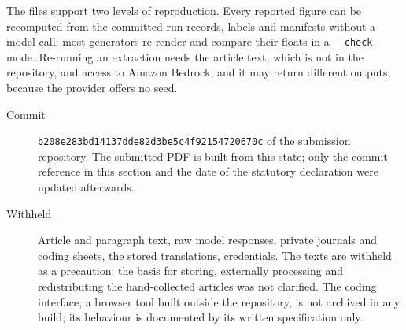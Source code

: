 \documentclass[12pt, a4paper]{article}
\theoremstyle{definition}
\begin{document}
The files support two levels of reproduction. Every reported figure can be recomputed from the committed run records, labels and manifests without a model call; most generators re-render and compare their floats in a \texttt{-{}-check} mode. Re-running an extraction needs the article text, which is not in the repository, and access to Amazon Bedrock, and it may return different outputs, because the provider offers no seed.

\begin{description}
\item[Commit] {\small\texttt{b208e283bd14137dde82d3be5c4f92154720670c}} of the submission repository. The submitted PDF is built from this state; only the commit reference in this section and the date of the statutory declaration were updated afterwards.
\item[Withheld] Article and paragraph text, raw model responses, private journals and coding sheets, the stored translations, credentials. The texts are withheld as a precaution: the basis for storing, externally processing and redistributing the hand-collected articles was not clarified. The coding interface, a browser tool built outside the repository, is not archived in any build; its behaviour is documented by its written specification only.
\end{description}
\end{document}
